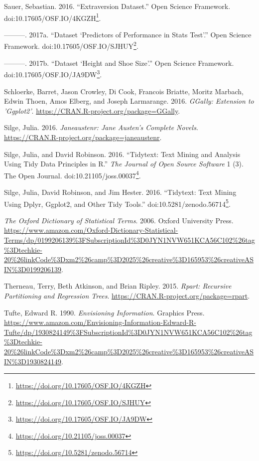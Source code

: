 \documentclass[12pt,]{book}
\renewcommand{\href}[2]{#2\footnote{\url{#1}}}
\begin{document}
\hypertarget{ref-Sauer_2016}{}
Sauer, Sebastian. 2016. ``Extraversion Dataset.'' Open Science
Framework.
doi:\href{https://doi.org/10.17605/OSF.IO/4KGZH}{10.17605/OSF.IO/4KGZH}.

\hypertarget{ref-Sauer_2017}{}
---------. 2017a. ``Dataset `Predictors of Performance in Stats Test'.''
Open Science Framework.
doi:\href{https://doi.org/10.17605/OSF.IO/SJHUY}{10.17605/OSF.IO/SJHUY}.

\hypertarget{ref-Sauer_2017a}{}
---------. 2017b. ``Dataset `Height and Shoe Size'.'' Open Science
Framework.
doi:\href{https://doi.org/10.17605/OSF.IO/JA9DW}{10.17605/OSF.IO/JA9DW}.

\hypertarget{ref-R-GGally}{}
Schloerke, Barret, Jason Crowley, Di Cook, Francois Briatte, Moritz
Marbach, Edwin Thoen, Amos Elberg, and Joseph Larmarange. 2016.
\emph{GGally: Extension to 'Ggplot2'}.
\url{https://CRAN.R-project.org/package=GGally}.

\hypertarget{ref-R-janeaustenr}{}
Silge, Julia. 2016. \emph{Janeaustenr: Jane Austen's Complete Novels}.
\url{https://CRAN.R-project.org/package=janeaustenr}.

\hypertarget{ref-Silge2016}{}
Silge, Julia, and David Robinson. 2016. ``Tidytext: Text Mining and
Analysis Using Tidy Data Principles in R.'' \emph{The Journal of Open
Source Software} 1 (3). The Open Journal.
doi:\href{https://doi.org/10.21105/joss.00037}{10.21105/joss.00037}.

\hypertarget{ref-tidytext-archive}{}
Silge, Julia, David Robinson, and Jim Hester. 2016. ``Tidytext: Text
Mining Using Dplyr, Ggplot2, and Other Tidy Tools.''
doi:\href{https://doi.org/10.5281/zenodo.56714}{10.5281/zenodo.56714}.

\hypertarget{ref-oxford}{}
\emph{The Oxford Dictionary of Statistical Terms}. 2006. Oxford
University Press.
\url{https://www.amazon.com/Oxford-Dictionary-Statistical-Terms/dp/0199206139\%3FSubscriptionId\%3D0JYN1NVW651KCA56C102\%26tag\%3Dtechkie-20\%26linkCode\%3Dxm2\%26camp\%3D2025\%26creative\%3D165953\%26creativeASIN\%3D0199206139}.

\hypertarget{ref-R-rpart}{}
Therneau, Terry, Beth Atkinson, and Brian Ripley. 2015. \emph{Rpart:
Recursive Partitioning and Regression Trees}.
\url{https://CRAN.R-project.org/package=rpart}.

\hypertarget{ref-1930824149}{}
Tufte, Edward R. 1990. \emph{Envisioning Information}. Graphics Press.
\url{https://www.amazon.com/Envisioning-Information-Edward-R-Tufte/dp/1930824149\%3FSubscriptionId\%3D0JYN1NVW651KCA56C102\%26tag\%3Dtechkie-20\%26linkCode\%3Dxm2\%26camp\%3D2025\%26creative\%3D165953\%26creativeASIN\%3D1930824149}.
\end{document}

